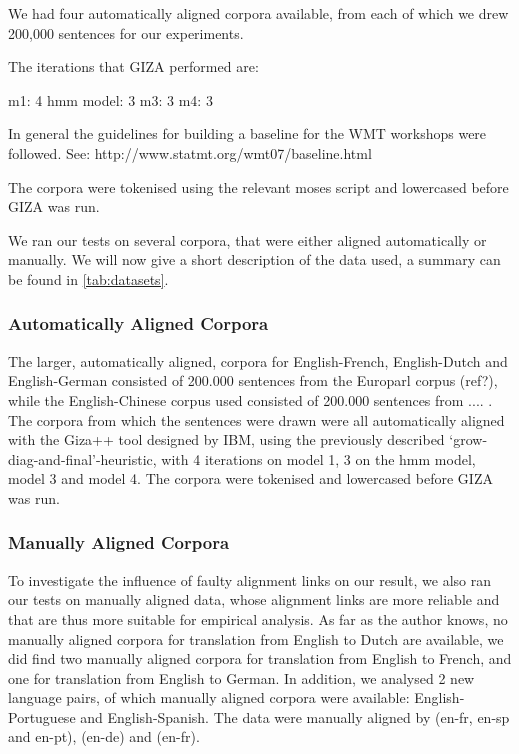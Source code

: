 \documentclass{report}
\theoremstyle{break}
\begin{document}
We had four automatically aligned corpora available, from each of which we drew 200,000 sentences for our experiments. 

The iterations that GIZA performed are:

m1: 4
hmm model: 3
m3: 3
m4: 3

In general the guidelines for building a baseline for the WMT workshops were followed. See:
http://www.statmt.org/wmt07/baseline.html

The corpora were tokenised using the relevant moses script and lowercased before GIZA was run.



We ran our tests on several corpora, that were either aligned automatically or manually.  We will now give a short description of the data used, a summary can be found in \ref{tab:datasets}.

\subsubsection{Automatically Aligned Corpora}
The larger, automatically aligned, corpora for English-French, English-Dutch and English-German consisted of 200.000 sentences from the Europarl corpus (ref?), while the English-Chinese corpus used consisted of 200.000 sentences from .... . The corpora from which the sentences were drawn were all automatically aligned with the Giza++ tool \citep{koehn2007moses} designed by IBM, using the previously described `grow-diag-and-final'-heuristic, with 4 iterations on model 1, 3 on the hmm model, model 3 and model 4. The corpora were tokenised and lowercased before GIZA was run.


\subsubsection{Manually Aligned Corpora}
To investigate the influence of faulty alignment links on our result, we also ran our tests on manually aligned data, whose alignment links are more reliable and that are thus more suitable for empirical analysis. As far as the author knows, no manually aligned corpora for translation from English to Dutch are available, we did find two manually aligned corpora for translation from English to French, and one for translation from English to German. In addition, we analysed  2 new language pairs, of which manually aligned corpora were available: English-Portuguese and English-Spanish. The data were manually aligned by \cite{graca2008building} (en-fr, en-sp and en-pt), \cite{pado2006optimal} (en-de) and \cite{och2000improved} (en-fr).
\end{document}
